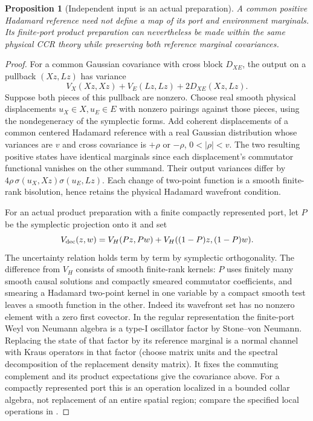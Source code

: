 \documentclass[11pt]{article}
\newtheorem{proposition}[theorem]{Proposition}
\begin{document}
\begin{proposition}[Independent input is an actual preparation]
\label{thm:preparation}
A common positive Hadamard reference need not define a map of its port and environment marginals. Its finite-port product preparation can nevertheless be made within the same physical CCR theory while preserving both reference marginal covariances.
\end{proposition}
\begin{proof}
For a common Gaussian covariance with cross block \(D_{XE}\), the output on a pullback \((Xz,Lz)\) has variance
\[
 V_X(Xz,Xz)+V_E(Lz,Lz)+2D_{XE}(Xz,Lz).
\]
Suppose both pieces of this pullback are nonzero. Choose real smooth physical displacements \(u_X\in X,u_E\in E\) with nonzero pairings against those pieces, using the nondegeneracy of the symplectic forms. Add coherent displacements of a common centered Hadamard reference with a real Gaussian distribution whose variances are \(v\) and cross covariance is \(+\rho\) or \(-\rho\), \(0<|\rho|<v\). The two resulting positive states have identical marginals since each displacement's commutator functional vanishes on the other summand. Their output variances differ by
\(4\rho\,\sigma(u_X,Xz)\sigma(u_E,Lz)\). Each change of two-point function is a smooth finite-rank bisolution, hence retains the physical Hadamard wavefront condition.

For an actual product preparation with a finite compactly represented port, let \(P\) be the symplectic projection onto it and set
\[
 V_{\rm dec}(z,w)= V_H(Pz,Pw)+V_H((1-P)z,(1-P)w).
\]
The uncertainty relation holds term by term by symplectic orthogonality. The difference from \(V_H\) consists of smooth finite-rank kernels: \(P\) uses finitely many smooth causal solutions and compactly smeared commutator coefficients, and smearing a Hadamard two-point kernel in one variable by a compact smooth test leaves a smooth function in the other. Indeed its wavefront set has no nonzero element with a zero first covector. In the regular representation the finite-port Weyl von Neumann algebra is a type-I oscillator factor by Stone--von Neumann. Replacing the state of that factor by its reference marginal is a normal channel with Kraus operators in that factor (choose matrix units and the spectral decomposition of the replacement density matrix). It fixes the commuting complement and its product expectations give the covariance above. For a compactly represented port this is an operation localized in a bounded collar algebra, not replacement of an entire spatial region; compare the specified local operations in \cite{fv}.
\end{proof}
\end{document}
